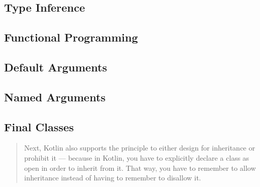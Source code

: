 \documentclass[11pt, a4paper]{report}
\begin{document}
\subsection{Type Inference}

\subsection{Functional Programming}

\subsection{Default Arguments}

\subsection{Named Arguments}

\subsection{Final Classes}

\begin{quotation}
Next, Kotlin also supports the principle to either design for inheritance or prohibit it — because in Kotlin, you have to explicitly declare a class as open in order to inherit from it. That way, you have to remember to allow inheritance instead of having to remember to disallow it.\cite{kotlin-sommerhoff}
\end{quotation}

\listoffigures
\end{document}
